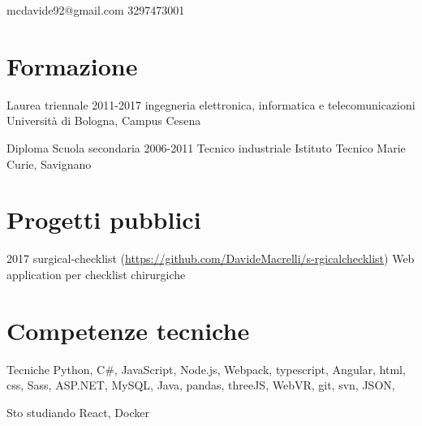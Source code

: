\documentclass{tccv}
\begin{document}
    {mcdavide92@gmail.com}
    {3297473001}
    


\section{Formazione}

\begin{yearlist}

\item[Laurea triennale]{2011-2017}
{ingegneria elettronica, informatica e telecomunicazioni}
{Università di Bologna, Campus Cesena}

\item[Diploma Scuola secondaria]{2006-2011}
{Tecnico industriale}
{Istituto Tecnico Marie Curie, Savignano}



\end{yearlist}

\section{Progetti pubblici}

\begin{yearlist}

\item{2017}
     {surgical-checklist (\href{https://github.com/DavideMacrelli/surgicalchecklist}{https://github.com/DavideMacrelli/s-rgicalchecklist})}
     {Web application per checklist chirurgiche}


\end{yearlist}

\section{Competenze tecniche}

\begin{factlist}

\item{Tecniche}
     {Python,  C\#, JavaScript, Node.js, Webpack, typescript, Angular, html, css, Sass, ASP.NET, MySQL, Java, pandas, threeJS, WebVR, git, svn, JSON,}


\item{Sto studiando}
     {React, Docker}


\end{factlist}
\end{document}
